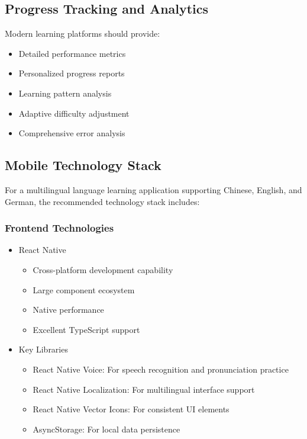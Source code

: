 \subsection{Progress Tracking and Analytics}
Modern learning platforms should provide:
\begin{itemize}
    \item Detailed performance metrics
    \item Personalized progress reports
    \item Learning pattern analysis
    \item Adaptive difficulty adjustment
    \item Comprehensive error analysis
\end{itemize}

\subsection{Mobile Technology Stack}
For a multilingual language learning application supporting Chinese, English, and German, the recommended technology stack includes:

\subsubsection{Frontend Technologies}
\begin{itemize}
    \item React Native
    \begin{itemize}
        \item Cross-platform development capability
        \item Large component ecosystem
        \item Native performance
        \item Excellent TypeScript support
    \end{itemize}
    
    \item Key Libraries
    \begin{itemize}
        \item React Native Voice: For speech recognition and pronunciation practice
        \item React Native Localization: For multilingual interface support
        \item React Native Vector Icons: For consistent UI elements
        \item AsyncStorage: For local data persistence
    \end{itemize}
\end{itemize}

